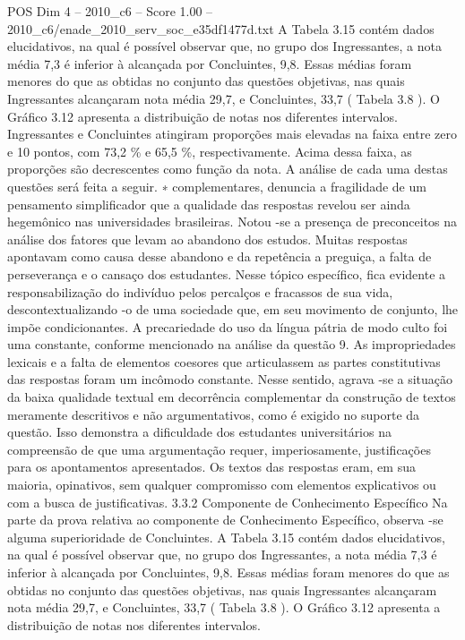 \begin{textsample}{POS Dim 4 – 2010\_c6 – Score 1.00 – 2010\_c6/enade\_2010\_serv\_soc\_e35df1477d.txt}
A Tabela 3.15 contém dados elucidativos, na qual é possível observar que, no grupo dos Ingressantes, a nota média 7,3 é inferior à alcançada por Concluintes, 9,8.
Essas médias foram menores do que as obtidas no conjunto das questões objetivas, nas quais Ingressantes alcançaram nota média 29,7, e Concluintes, 33,7 ( Tabela 3.8 ).
O Gráfico 3.12 apresenta a distribuição de notas nos diferentes intervalos.
Ingressantes e Concluintes atingiram proporções mais elevadas na faixa entre zero e 10 pontos, com 73,2 \% e 65,5 \%, respectivamente.
Acima dessa faixa, as proporções são decrescentes como função da nota.
A análise de cada uma destas questões será feita a seguir. ∗ complementares, denuncia a fragilidade de um pensamento simplificador que a qualidade das respostas revelou ser ainda hegemônico nas universidades brasileiras.
Notou -se a presença de preconceitos na análise dos fatores que levam ao abandono dos estudos.
Muitas respostas apontavam como causa desse abandono e da repetência a preguiça, a falta de perseverança e o cansaço dos estudantes.
Nesse tópico específico, fica evidente a responsabilização do indivíduo pelos percalços e fracassos de sua vida, descontextualizando -o de uma sociedade que, em seu movimento de conjunto, lhe impõe condicionantes.
A precariedade do uso da língua pátria de modo culto foi uma constante, conforme mencionado na análise da questão 9.
As impropriedades lexicais e a falta de elementos coesores que articulassem as partes constitutivas das respostas foram um incômodo constante.
Nesse sentido, agrava -se a situação da baixa qualidade textual em decorrência complementar da construção de textos meramente descritivos e não argumentativos, como é exigido no suporte da questão.
Isso demonstra a dificuldade dos estudantes universitários na compreensão de que uma argumentação requer, imperiosamente, justificações para os apontamentos apresentados.
Os textos das respostas eram, em sua maioria, opinativos, sem qualquer compromisso com elementos explicativos ou com a busca de justificativas. 3.3.2 Componente de Conhecimento Específico Na parte da prova relativa ao componente de Conhecimento Específico, observa -se alguma superioridade de Concluintes.
A Tabela 3.15 contém dados elucidativos, na qual é possível observar que, no grupo dos Ingressantes, a nota média 7,3 é inferior à alcançada por Concluintes, 9,8.
Essas médias foram menores do que as obtidas no conjunto das questões objetivas, nas quais Ingressantes alcançaram nota média 29,7, e Concluintes, 33,7 ( Tabela 3.8 ).
O Gráfico 3.12 apresenta a distribuição de notas nos diferentes intervalos.

\end{textsample}
